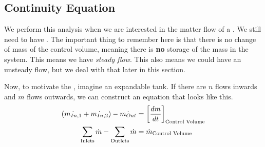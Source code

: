 \subsection{Continuity Equation}\label{subsec:Continuity_Equation}
We perform this analysis when we are interested in the matter flow of a .
We still need to have .
The important thing to remember here is that there is no change of mass of the control volume, meaning there is \textbf{no} storage of the mass in the system.
This means we have \emph{steady flow}.
This also means we could have an unsteady flow, but we deal with that later in this section.

Now, to motivate the , imagine an expandable tank.
If there are $n$ flows inwards and $m$ flows outwards, we can construct an equation that looks like this.
\begin{align*}
  (\dot{m_{In,1}} + \dot{m_{In,2}}) - \dot{m_{Out}} &= {\left[ \frac{dm}{dt} \right]}_{\text{Control Volume}} \\
  \sum\limits_{\text{Inlets}} \dot{m} - \sum\limits_{\text{Outlets}} \dot{m} &= \dot{m}_{\text{Control Volume}}
\end{align*}


